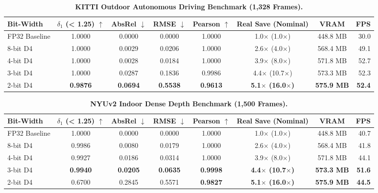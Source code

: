 \documentclass[10pt,twocolumn,letterpaper]{article}
\begin{document}
\begin{table}[t]
\centering
\caption{\textbf{KITTI Outdoor Autonomous Driving Benchmark (1,328 Frames).}}
\label{tab:kitti}
\begin{tabular}{lccccccr}
\toprule
Bit-Width & $\delta_1$ (< 1.25) $\uparrow$ & AbsRel $\downarrow$ & RMSE $\downarrow$ & Pearson $\uparrow$ & Real Save (Nominal) & VRAM & FPS \\
\midrule
FP32 Baseline & 1.0000 & 0.0000 & 0.0000 & 1.0000 & 1.0$\times$ (1.0$\times$) & 448.8 MB & 30.0 \\
8-bit D4 & 1.0000 & 0.0029 & 0.0206 & 1.0000 & 2.6$\times$ (4.0$\times$) & 568.4 MB & 49.1 \\
4-bit D4 & 1.0000 & 0.0028 & 0.0184 & 1.0000 & 3.9$\times$ (8.0$\times$) & 571.8 MB & 52.7 \\
3-bit D4 & 1.0000 & 0.0287 & 0.1836 & 0.9986 & 4.4$\times$ (10.7$\times$) & 573.3 MB & 52.3 \\
2-bit D4 & \textbf{0.9876} & \textbf{0.0694} & \textbf{0.5538} & \textbf{0.9613} & \textbf{5.1$\times$ (16.0$\times$)} & \textbf{575.9 MB} & \textbf{52.4} \\
\bottomrule
\end{tabular}
\end{table}

\begin{table}[t]
\centering
\caption{\textbf{NYUv2 Indoor Dense Depth Benchmark (1,500 Frames).}}
\label{tab:nyuv2}
\begin{tabular}{lccccccr}
\toprule
Bit-Width & $\delta_1$ (< 1.25) $\uparrow$ & AbsRel $\downarrow$ & RMSE $\downarrow$ & Pearson $\uparrow$ & Real Save (Nominal) & VRAM & FPS \\
\midrule
FP32 Baseline & 1.0000 & 0.0000 & 0.0000 & 1.0000 & 1.0$\times$ (1.0$\times$) & 448.8 MB & 40.7 \\
8-bit D4 & 0.9986 & 0.0080 & 0.0179 & 1.0000 & 2.6$\times$ (4.0$\times$) & 568.4 MB & 41.8 \\
4-bit D4 & 0.9927 & 0.0186 & 0.0314 & 1.0000 & 3.9$\times$ (8.0$\times$) & 571.8 MB & 44.1 \\
3-bit D4 & \textbf{0.9940} & \textbf{0.0205} & \textbf{0.0635} & \textbf{0.9998} & \textbf{4.4$\times$ (10.7$\times$)} & \textbf{573.3 MB} & \textbf{51.6} \\
2-bit D4 & 0.6700 & 0.2845 & 0.5571 & \textbf{0.9827} & \textbf{5.1$\times$ (16.0$\times$)} & \textbf{575.9 MB} & \textbf{44.5} \\
\bottomrule
\end{tabular}
\end{table}
\end{document}
